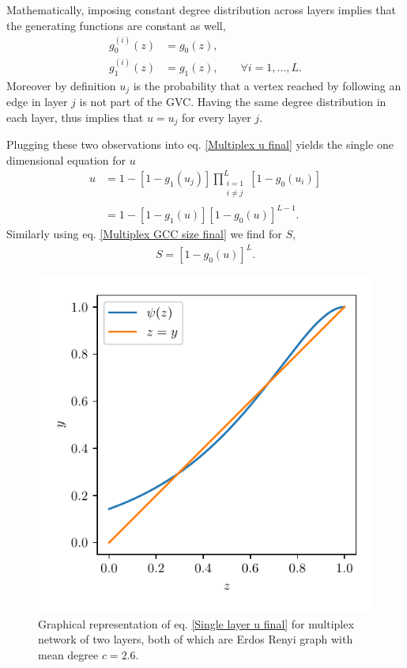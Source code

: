 \documentclass[
11pt, %
american, %
singlespacing, %
final, %
nolistspacing, %
liststotoc, %
headsepline, %
]{MastersDoctoralThesis} %
\begin{document}
Mathematically, imposing constant degree distribution across layers implies that the generating functions are constant as well,
\begin{align}
	g^{(i)}_0(z) &= g_0(z), \\
	g^{(i)}_1(z) &= g_1(z), \qquad \forall i = 1, \dots, L.
\end{align}
Moreover by definition $u_j$ is the probability that a vertex reached by following an edge in layer $j$ is not part of the GVC. Having the same degree distribution in each layer, thus implies that $u = u_j$ for every layer $j$.

Plugging these two observations into eq. \eqref{Multiplex u final} yields the single one dimensional equation for $u$
\begin{align}
	u &= 1 - \left[1 - g_1(u_j) \right] \prod_{\substack{i = 1 \\ i \neq j}}^{L}  \left[1 - g_0(u_i) \right] \\
		&= 1 - \left[1 - g_1(u) \right] \left[1 - g_0(u) \right]^{L - 1}. \label{Single parameter u final}
\end{align}
Similarly using eq. \eqref{Multiplex GCC size final} we find for $S$,
\begin{align}
	S = \left[1 - g_0(u) \right]^L. \label{Single parameter S final}
\end{align}

\begin{figure}
	\includegraphics[scale=1]{single_param_u_solution_graphically.pdf}
	\caption{Graphical representation of eq. \eqref{Single layer u final} for multiplex network of two layers, both of which are Erdos Renyi graph with mean degree $c = 2.6$.}
	\label{Figure: Solution of u = psi(u) graphically for single param}
\end{figure}
\end{document}
